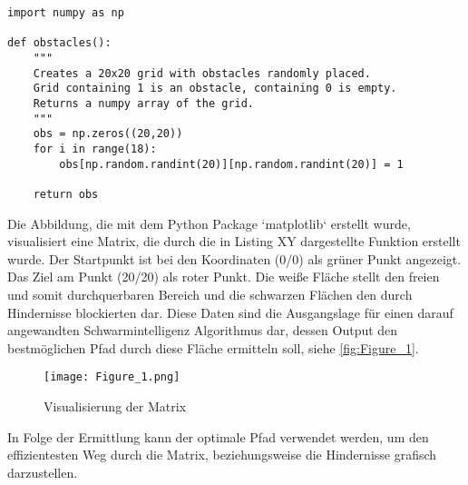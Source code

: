 \begin{verbatim}
import numpy as np

def obstacles():
    """
    Creates a 20x20 grid with obstacles randomly placed.
    Grid containing 1 is an obstacle, containing 0 is empty.
    Returns a numpy array of the grid.
    """
    obs = np.zeros((20,20))
    for i in range(18):
        obs[np.random.randint(20)][np.random.randint(20)] = 1  
  
    return obs
\end{verbatim}
\vspace*{-3mm}
\vspace*{3mm}

Die Abbildung, die mit dem Python Package `matplotlib` erstellt wurde, visualisiert eine Matrix, die durch die in Listing XY dargestellte Funktion erstellt wurde. Der Startpunkt ist bei den Koordinaten (0/0) als grüner Punkt angezeigt. Das Ziel am Punkt (20/20) als roter Punkt. Die weiße Fläche stellt den freien und somit durchquerbaren Bereich und die schwarzen Flächen den durch Hindernisse blockierten dar. Diese Daten sind die Ausgangslage für einen darauf angewandten Schwarmintelligenz Algorithmus dar, dessen Output den bestmöglichen Pfad durch diese Fläche ermitteln soll, siehe \autoref{fig:Figure_1}.
\begin{figure}[H]
    \centering
    \texttt{[image: Figure\_1.png]}
    \caption{Visualisierung der Matrix}
    \label{fig:Figure_1}
\end{figure}

In Folge der Ermittlung kann der optimale Pfad verwendet werden, um den effizientesten Weg durch die Matrix, beziehungsweise die Hindernisse grafisch darzustellen.

